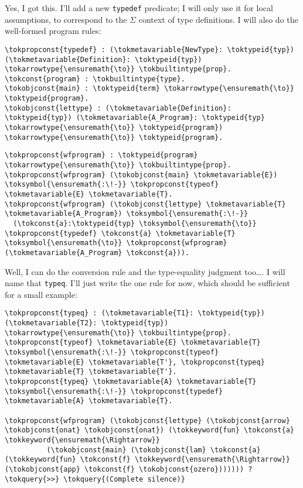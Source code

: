 \heroSTUDENT{} Yes, I got this. I'll add a new \texttt{typedef} predicate; I
will only use it for local assumptions, to correspond to the \(\Sigma\)
context of type definitions. I will also do the well-formed program
rules:

\begin{verbatim}
\tokpropconst{typedef} : (\tokmetavariable{NewType}: \toktypeid{typ}) (\tokmetavariable{Definition}: \toktypeid{typ}) \tokarrowtype{\ensuremath{\to}} \tokbuiltintype{prop}.
\tokconst{program} : \tokbuiltintype{type}. 
\tokobjconst{main} : \toktypeid{term} \tokarrowtype{\ensuremath{\to}} \toktypeid{program}. 
\tokobjconst{lettype} : (\tokmetavariable{Definition}: \toktypeid{typ}) (\tokmetavariable{A_Program}: \toktypeid{typ} \tokarrowtype{\ensuremath{\to}} \toktypeid{program}) \tokarrowtype{\ensuremath{\to}} \toktypeid{program}.
\end{verbatim}

\importantCodeblock{}

\begin{verbatim}
\tokpropconst{wfprogram} : \toktypeid{program} \tokarrowtype{\ensuremath{\to}} \tokbuiltintype{prop}.
\tokpropconst{wfprogram} (\tokobjconst{main} \tokmetavariable{E}) \toksymbol{\ensuremath{:\!-}} \tokpropconst{typeof} \tokmetavariable{E} \tokmetavariable{T}.
\tokpropconst{wfprogram} (\tokobjconst{lettype} \tokmetavariable{T} \tokmetavariable{A_Program}) \toksymbol{\ensuremath{:\!-}}
  (\tokconst{a}:\toktypeid{typ} \toksymbol{\ensuremath{\to}} \tokpropconst{typedef} \tokconst{a} \tokmetavariable{T} \toksymbol{\ensuremath{\to}} \tokpropconst{wfprogram} (\tokmetavariable{A_Program} \tokconst{a})).
\end{verbatim}

\importantCodeblockEnd{}

\noindent
Well, I can do the conversion rule and the type-equality judgment
too\ldots{}. I will name that \texttt{typeq}. I'll just write the one
rule for now, which should be sufficient for a small example:

\begin{verbatim}
\tokpropconst{typeq} : (\tokmetavariable{T1}: \toktypeid{typ}) (\tokmetavariable{T2}: \toktypeid{typ}) \tokarrowtype{\ensuremath{\to}} \tokbuiltintype{prop}.
\tokpropconst{typeof} \tokmetavariable{E} \tokmetavariable{T} \toksymbol{\ensuremath{:\!-}} \tokpropconst{typeof} \tokmetavariable{E} \tokmetavariable{T'}, \tokpropconst{typeq} \tokmetavariable{T} \tokmetavariable{T'}.
\tokpropconst{typeq} \tokmetavariable{A} \tokmetavariable{T} \toksymbol{\ensuremath{:\!-}} \tokpropconst{typedef} \tokmetavariable{A} \tokmetavariable{T}.

\tokpropconst{wfprogram} (\tokobjconst{lettype} (\tokobjconst{arrow} \tokobjconst{onat} \tokobjconst{onat}) (\tokkeyword{fun} \tokconst{a} \tokkeyword{\ensuremath{\Rightarrow}}
          (\tokobjconst{main} (\tokobjconst{lam} \tokconst{a} (\tokkeyword{fun} \tokconst{f} \tokkeyword{\ensuremath{\Rightarrow}} (\tokobjconst{app} \tokconst{f} \tokobjconst{ozero})))))) ?
\tokquery{>>} \tokquery{(Complete silence)}
\end{verbatim}

